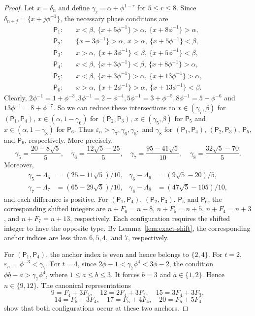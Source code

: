 \documentclass[11pt]{amsart}
\theoremstyle{definition}
\newcommand{\eps}{\varepsilon}
\begin{document}
\begin{proof}
Let $x=\delta_n$ and define $\gamma_r=\alpha+\phi^{1-r}$ for
$5\leq r\leq8$. Since $\delta_{n+j}=\{x+j\phi^{-1}\}$, the necessary
phase conditions are
\[
\begin{aligned}
\mathsf P_1:&\quad x<\beta,
 \ \{x+5\phi^{-1}\}>\alpha,
 \ \{x+8\phi^{-1}\}>\alpha,\\
\mathsf P_2:&\quad \{x-3\phi^{-1}\}>\alpha,
 \ x>\alpha,
 \ \{x+5\phi^{-1}\}<\beta,\\
\mathsf P_3:&\quad x>\alpha,
 \ \{x+3\phi^{-1}\}<\beta,
 \ \{x+5\phi^{-1}\}<\beta,\\
\mathsf P_4:&\quad x<\beta,
 \ \{x+3\phi^{-1}\}<\beta,
 \ \{x+8\phi^{-1}\}>\alpha,\\
\mathsf P_5:&\quad x<\beta,
 \ \{x+3\phi^{-1}\}>\alpha,
 \ \{x+13\phi^{-1}\}>\alpha,\\
\mathsf P_6:&\quad x>\alpha,
 \ \{x+2\phi^{-1}\}>\alpha,
 \ \{x+13\phi^{-1}\}<\beta.
\end{aligned}
\]
Clearly, $2\phi^{-1}=1+\phi^{-3}, 3\phi^{-1}=2-\phi^{-4}, 5\phi^{-1}=3+\phi^{-5}, 8\phi^{-1}=5-\phi^{-6}$ and $13\phi^{-1}=8+\phi^{-7}$. So we can
reduce these intersections to $x\in(\gamma_7,\beta)$ for $(\mathsf P_1,\mathsf P_4)$, $x\in(\alpha,1-\gamma_6)$ for $(\mathsf P_2,\mathsf P_3)$, $x\in(\gamma_5,\beta)$ for $\mathsf P_5$ and $x\in(\alpha,1-\gamma_8)$ for $\mathsf P_6$. Thus $\eps_n>\gamma_7,\gamma_6,\gamma_5,$ and $\gamma_8$ for
$(\mathsf P_1,\mathsf P_4)$, $(\mathsf P_2,\mathsf P_3)$,
$\mathsf P_5$, and $\mathsf P_6$, respectively.
More precisely,
\[
\gamma_5=\frac{20-8\sqrt5}{5},\quad
\gamma_6=\frac{12\sqrt5-25}{5},\quad
\gamma_7=\frac{95-41\sqrt5}{10},\quad
\gamma_8=\frac{32\sqrt5-70}{5}.
\]
Moreover,
\[
\begin{aligned}
\gamma_5-\Lambda_5&=(25-11\sqrt5)/10,&
\gamma_6-\Lambda_6&=(9\sqrt5-20)/5,\\
\gamma_7-\Lambda_7&=(65-29\sqrt5)/10,&
\gamma_8-\Lambda_8&=(47\sqrt5-105)/10,
\end{aligned}
\]
and each difference is positive. For $(\mathsf P_1,\mathsf P_4)$, $(\mathsf P_2,\mathsf P_3)$,
$\mathsf P_5$ and $\mathsf P_6$, the corresponding shifted integers are
$n+F_6=n+8$, $n+F_5=n+5$, $n+F_4=n+3$, and
$n+F_7=n+13$, respectively. Each configuration
requires the shifted integer to have the opposite type. By
Lemma~\ref{lem:exact-shift}, the corresponding anchor indices are less
than $6,5,4,$ and $7$, respectively.

For $(\mathsf P_1,\mathsf P_4)$, the anchor index is even and hence
belongs to $\{2,4\}$. For $t=2$, $\eps_n=\phi^{-3}<\gamma_7$. For
$t=4$, since $2\phi-1<\gamma_7\phi^4<3\phi-2$, the condition $\phi b-a>\gamma_7\phi^4$, where
$1\leq a\leq b\leq3$. It forces $b=3$ and $a\in\{1,2\}$. Hence
$n\in\{9,12\}$. The canonical representations
\[
9=F_4+3F_3,\quad 12=2F_4+3F_3,\quad 15=3F_4+3F_3,
\]
\[
14=F_5+3F_4,\quad17=F_5+4F_4,\quad20=F_5+5F_4
\]
show that both configurations occur at these two anchors.


\end{proof}
\end{document}

